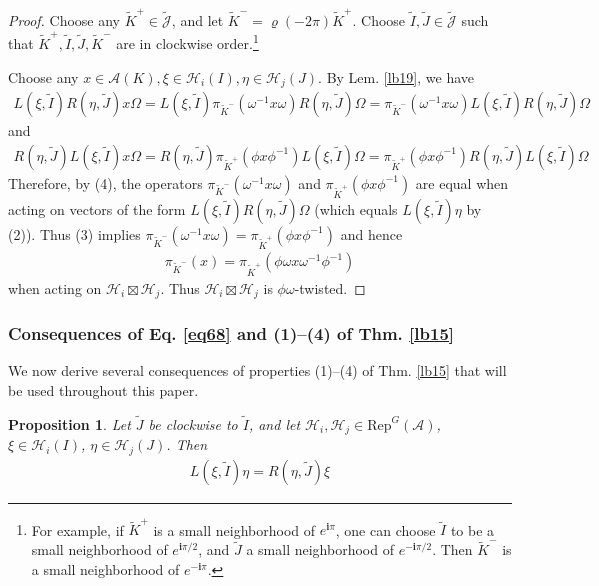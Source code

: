 \documentclass[11pt,b5paper,notitlepage]{article}
\theoremstyle{definition}
\theoremstyle{plain}
\newtheorem{pp}[df]{Proposition}
\newcommand{\wtd}{\widetilde}
\newcommand{\RepGA}{\mathrm{Rep}^G(\mathcal A)}
\newcommand{\Jtd}{\widetilde{\mathcal J}}
\newcommand{\im}{\mathbf{i}}
\newcommand{\MA}{\mathcal A}
\newcommand{\MH}{\mathcal H}
\numberwithin{equation}{section}
\begin{document}
\begin{proof}
Choose any $\wtd K^+\in\Jtd$, and let $\wtd K^-=\varrho(-2\pi)\wtd K^+$. Choose $\wtd I,\wtd J\in\Jtd$ such that $\wtd K^+,\wtd I,\wtd J,\wtd K^-$ are in clockwise order.\footnote{For example, if $\wtd K^+$ is a small neighborhood of $e^{\im\pi}$, one can choose $\wtd I$ to be a small neighborhood of $e^{\im\pi/2}$, and $\wtd J$ a small neighborhood of $e^{-\im\pi/2}$. Then $\wtd K^-$ is a small neighborhood of $e^{-\im\pi}$.}

Choose any $x\in\MA(K),\xi\in\MH_i(I),\eta\in\MH_j(J)$. By Lem. \ref{lb19}, we have
\begin{align*}
L(\xi,\wtd I)R(\eta,\wtd J)x\Omega=L(\xi,\wtd I)\pi_{\wtd K^-}(\omega^{-1}x\omega)R(\eta,\wtd J)\Omega=\pi_{\wtd K^-}(\omega^{-1}x\omega)L(\xi,\wtd I)R(\eta,\wtd J)\Omega
\end{align*}
and
\begin{align*}
R(\eta,\wtd J)L(\xi,\wtd I)x\Omega=R(\eta,\wtd J)\pi_{\wtd K^+}(\phi x\phi^{-1})L(\xi,\wtd I)\Omega=\pi_{\wtd K^+}(\phi x\phi^{-1})R(\eta,\wtd J)L(\xi,\wtd I)\Omega
\end{align*}
Therefore, by (4), the operators $\pi_{\wtd K^-}(\omega^{-1}x\omega)$ and $\pi_{\wtd K^+}(\phi x\phi^{-1})$ are equal when acting on vectors of the form $L(\xi,\wtd I)R(\eta,\wtd J)\Omega$ (which equals $L(\xi,\wtd I)\eta$ by (2)). Thus (3) implies $\pi_{\wtd K^-}(\omega^{-1}x\omega)=\pi_{\wtd K^+}(\phi x\phi^{-1})$ and hence
\begin{align*}
\pi_{\wtd K^-}(x)=\pi_{\wtd K^+}(\phi\omega x\omega^{-1}\phi^{-1})
\end{align*}
when acting on $\MH_i\boxtimes\MH_j$. Thus $\MH_i\boxtimes\MH_j$ is $\phi\omega$-twisted.
\end{proof}







\subsubsection{Consequences of Eq. \eqref{eq68} and (1)--(4) of Thm. \ref{lb15}}\label{lb141}

We now derive several consequences of properties (1)--(4) of Thm. \ref{lb15} that will be used throughout this paper.


\begin{pp}\label{lb20}
Let $\wtd J$ be clockwise to $\wtd I$, and let $\MH_i,\MH_j\in\RepGA$, $\xi\in\MH_i(I)$, $\eta\in\MH_j(J)$. Then
\begin{align*}
L(\xi,\wtd I)\eta=R(\eta,\wtd J)\xi
\end{align*}
\end{pp}
\end{document}
